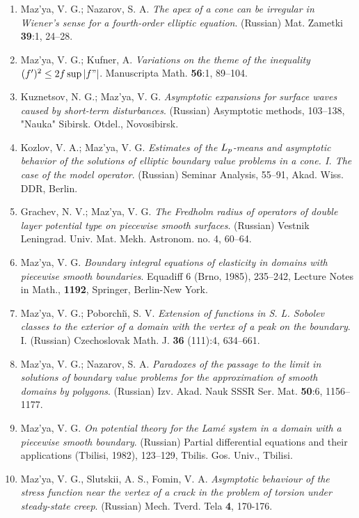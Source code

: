\documentclass{article}
\begin{document}
\begin{enumerate}
{\bf 1986}
\item Maz'ya, V. G.; Nazarov, S. A. {\it The apex of a cone can be
irregular in Wiener's sense for a fourth-order
elliptic equation}. (Russian) Mat. Zametki {\bf 39}:1, 24--28.
\item Maz'ya, V. G.; Kufner, A. {\it Variations on the theme of the
inequality $(f')\sp 2\leq 2f\,{\rm sup}\,\vert f"\vert $}. Manuscripta
Math. {\bf 56}:1, 89--104.
\item Kuznetsov, N. G.; Maz'ya, V. G. {\it Asymptotic expansions for
surface waves caused by
  short-term disturbances}. (Russian) Asymptotic methods, 103--138,
"Nauka"
Sibirsk. Otdel., Novosibirsk.
\item Kozlov, V. A.; Maz'ya, V. G. {\it Estimates of the $L\sb
p$-means and
asymptotic behavior of the solutions of elliptic
boundary value problems in a cone. I. The case of the model operator}.
(Russian) Seminar Analysis, 55--91, Akad. Wiss. DDR, Berlin.
\item Grachev, N. V.; Maz'ya, V. G. {\it The Fredholm radius of
operators
of double layer potential type on piecewise smooth
surfaces}. (Russian) Vestnik Leningrad. Univ. Mat. Mekh. Astronom. no.
4,
60--64.
\item Maz'ya, V. G. {\it Boundary integral equations of elasticity in
domains with piecewise smooth boundaries}.
Equadiff 6 (Brno, 1985), 235--242, Lecture Notes in Math., {\bf 1192},
Springer, Berlin-New York.
\item Maz'ya, V. G.; Poborchi{\u\i}, S. V. {\it Extension of functions
in
S. L. Sobolev classes to the
exterior of a domain with the vertex of a peak on the boundary}. I.
(Russian) Czechoslovak Math. J. {\bf 36} (111):4,
634--661.
\item Maz'ya, V. G.; Nazarov, S. A. {\it Paradoxes of the passage to
the
limit in solutions of boundary
value problems for the approximation of smooth domains by polygons}.
(Russian) Izv. Akad. Nauk SSSR Ser. Mat. {\bf 50}:6,
1156--1177.
\item Maz'ya, V. G. {\it On potential theory for the Lam\'e system in
a
domain with a piecewise smooth boundary}.
(Russian) Partial differential equations and their applications
(Tbilisi,
1982), 123--129, Tbilis. Gos. Univ.,
Tbilisi.
\item Maz'ya, V. G., Slutskii, A. S., Fomin, V. A. {\it Asymptotic
behaviour of the stress function near the vertex of a crack in
the problem of torsion under steady-state creep}. (Russian) Mech.
Tverd.
Tela {\bf 4}, 170-176.\hfill\break


\end{enumerate}
\end{document}
